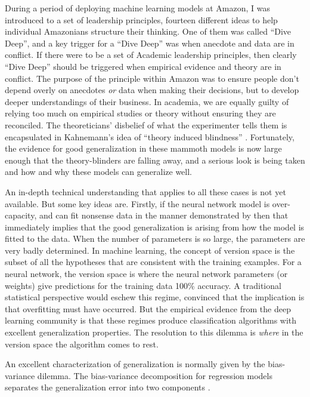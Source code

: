 \documentclass[a4paperpaper,]{article}
\begin{document}
During a period of deploying machine learning models at Amazon, I was
introduced to a set of leadership principles, fourteen different ideas
to help individual Amazonians structure their thinking. One of them was
called ``Dive Deep'', and a key trigger for a ``Dive Deep'' was when
anecdote and data are in conflict. If there were to be a set of Academic
leadership principles, then clearly ``Dive Deep'' should be triggered
when empirical evidence and theory are in conflict. The purpose of the
principle within Amazon was to ensure people don't depend overly on
anecdotes \emph{or} data when making their decisions, but to develop
deeper understandings of their business. In academia, we are equally
guilty of relying too much on empirical studies or theory without
ensuring they are reconciled. The theoreticians' disbelief of what the
experimenter tells them is encapsulated in Kahnemann's idea of ``theory
induced blindness'' \citep{Kahneman:fastslow11}. Fortunately, the
evidence for good generalization in these mammoth models is now large
enough that the theory-blinders are falling away, and a serious look is
being taken and how and why these models can generalize well.

An in-depth technical understanding that applies to all these cases is
not yet available. But some key ideas are. Firstly, if the neural
network model is over-capacity, and can fit nonsense data in the manner
demonstrated by \citep{Zhang:understanding17} then that immediately
implies that the good generalization is arising from how the model is
fitted to the data. When the number of parameters is so large, the
parameters are very badly determined. In machine learning, the concept
of version space \citep{Mitchell:version77} is the subset of all the
hypotheses that are consistent with the training examples. For a neural
network, the version space is where the neural network parameters (or
weights) give predictions for the training data 100\% accuracy. A
traditional statistical perspective would eschew this regime, convinced
that the implication is that overfitting must have occurred. But the
empirical evidence from the deep learning community is that these
regimes produce classification algorithms with excellent generalization
properties. The resolution to this dilemma is \emph{where} in the
version space the algorithm comes to rest.

An excellent characterization of generalization is normally given by the
bias-variance dilemma. The bias-variance decomposition for regression
models separates the generalization error into two components
\citep{Geman:biasvariance92}.
\end{document}
